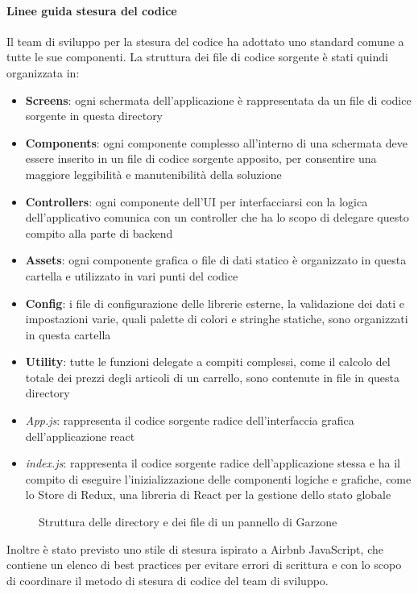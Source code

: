 \paragraph{Linee guida stesura del codice} Il team di sviluppo per la stesura del codice ha adottato uno standard comune a tutte le sue componenti. La struttura dei file di codice sorgente è stati quindi organizzata in:
\begin{itemize}
    \item \textbf{Screens}: ogni schermata dell'applicazione è rappresentata da un file di codice sorgente in questa directory
    \item \textbf{Components}: ogni componente complesso all'interno di una schermata deve essere inserito in un file di codice sorgente apposito, per consentire una maggiore leggibilità e manutenibilità della soluzione
    \item \textbf{Controllers}: ogni componente dell'UI per interfacciarsi con la logica dell'applicativo comunica con un controller che ha lo scopo di delegare questo compito alla parte di backend
    \item \textbf{Assets}: ogni componente grafica o file di dati statico è organizzato in questa cartella e utilizzato in vari punti del codice
    \item \textbf{Config}: i file di configurazione delle librerie esterne, la validazione dei dati e impostazioni varie, quali palette di colori e stringhe statiche, sono organizzati in questa cartella 
    \item \textbf{Utility}: tutte le funzioni delegate a compiti complessi, come il calcolo del totale dei prezzi degli articoli di un carrello, sono contenute in file in questa directory
    \item \textit{App.js}: rappresenta il codice sorgente radice dell'interfaccia grafica dell'applicazione react
    \item \textit{index.js}: rappresenta il codice sorgente radice dell'applicazione stessa e ha il compito di eseguire l'inizializzazione delle componenti logiche e grafiche, come lo Store di Redux, una libreria di React per la gestione dello stato globale
\end{itemize} 
\begin{figure}
\centering    
{}
\caption{Struttura delle directory e dei file di un pannello di Garzone}
\end{figure}
Inoltre è stato previsto uno stile di stesura ispirato a Airbnb JavaScript\cite{AIRBNB}, che contiene un elenco di best practices per evitare errori di scrittura e con lo scopo di coordinare il metodo di stesura di codice del team di sviluppo.
